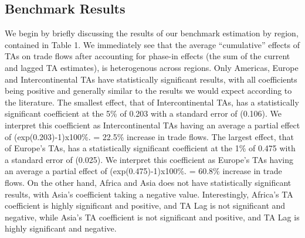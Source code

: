 \subsection{Benchmark Results}%
\label{subsec:BenchmarkResults}%
We begin by briefly discussing the results of our benchmark estimation
by region, contained in Table 1. We immediately see that the average
``cumulative'' effects of TAs on trade flows after accounting for
phase-in effects (the sum of the current and lagged TA estimates), is
heterogenous across regions. Only Americas, Europe and Intercontinental
TAs have statistically significant results, with all coefficients being
positive and generally similar to the results we would expect according
to the literature. The smallest effect, that of Intercontinental TAs,
has a statistically significant coefficient at the 5\% of 0.203 with a
standard error of (0.106). We interpret this coefficient as
Intercontinental TAs having an average a partial effect of
(exp(0.203)-1)x100\%. = 22.5\% increase in trade flows. The largest
effect, that of Europe's TAs, has a statistically significant
coefficient at the 1\% of 0.475 with a standard error of (0.025). We
interpret this coefficient as Europe's TAs having an average a partial
effect of (exp(0.475)-1)x100\%. = 60.8\% increase in trade flows. On the
other hand, Africa and Asia does not have statistically significant
results, with Asia's coefficient taking a negative value. Interestingly,
Africa's TA coefficient is highly significant and positive, and TA Lag
is not significant and negative, while Asia's TA coefficient is not
significant and positive, and TA Lag is highly significant and negative.
%
%
\FloatBarrier

%
